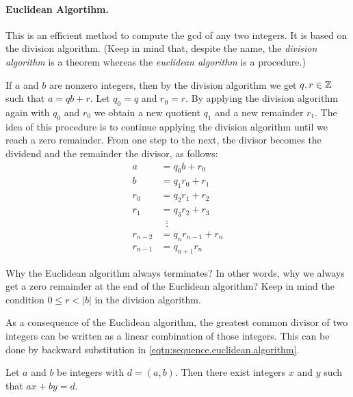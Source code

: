 \documentclass[11pt,a4paper]{article}
\begin{document}
\paragraph{Euclidean Algortihm.} This is an efficient method to compute the gcd of any  two integers.
It is based on the division algorithm.
(Keep in mind that, despite the name, the \textit{division algorithm} is a theorem whereas the \textit{euclidean algorithm} is a procedure.)

If \(a\) and \(b\) are nonzero integers, then by the division algorithm we get \(q,r\in \mathbb{Z}\) such that \(a= qb+r\).
Let \(q_0=q\) and \(r_0=r\).
By applying the division algorithm again with \(q_0\) and \(r_0\) we obtain a new quotient \(q_1\)   and a new remainder \(r_1\).
The idea of this procedure is to continue applying the division algorithm until we reach a zero remainder. From one step to the next,  the divisor becomes the dividend and the remainder the divisor, as follows:
\begin{equation}\label{eqtn:sequence.euclidean.algorithm}
\begin{aligned}
    a & =q_0 b+r_0 \\
    b & =q_1 r_0+r_1 \\
    r_0 & =q_2 r_1+r_2 \\
    r_1 & =q_3 r_2+r_3 \\
    &\;\; \vdots \\
    r_{n-2} & =q_n r_{n-1}+r_n \\
    r_{n-1} & =q_{n+1} r_n
\end{aligned}
\end{equation}


\begin{que}
    Why the Euclidean algorithm always terminates? In other words,
    why we always get a zero remainder at the end of the Euclidean algorithm? 
    Keep in mind the condition \(0\leq r < |b|\) in the division algorithm.
\end{que}

As a consequence of the Euclidean algorithm,
the greatest common divisor of two integers can be written as a linear combination of those integers. This can be done by backward substitution in \eqref{eqtn:sequence.euclidean.algorithm}.

\begin{teo}
    Let $a$ and $b$ be integers with $d=(a,b)$. Then there exist integers $x$ and $y$ such that $a x+b y=d$. 
\end{teo}
\end{document}
